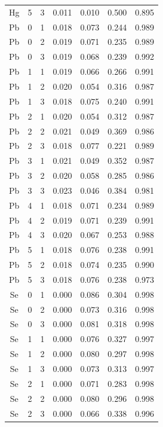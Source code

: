 \documentclass[ms, hidelinks]{uncgdissertationexp}
\theoremstyle{plain}
\theoremstyle{definition}
\theoremstyle{remark}
\begin{document}
\begin{longtable}{ccccccc}
Hg & 5 & 3 & 0.011 & 0.010 & 0.500 & 0.895\\
\rowcolor{gray!6}  Pb & 0 & 1 & 0.018 & 0.073 & 0.244 & 0.989\\
Pb & 0 & 2 & 0.019 & 0.071 & 0.235 & 0.989\\
\rowcolor{gray!6}  Pb & 0 & 3 & 0.019 & 0.068 & 0.239 & 0.992\\
Pb & 1 & 1 & 0.019 & 0.066 & 0.266 & 0.991\\
\rowcolor{gray!6}  Pb & 1 & 2 & 0.020 & 0.054 & 0.316 & 0.987\\
Pb & 1 & 3 & 0.018 & 0.075 & 0.240 & 0.991\\
\rowcolor{gray!6}  Pb & 2 & 1 & 0.020 & 0.054 & 0.312 & 0.987\\
Pb & 2 & 2 & 0.021 & 0.049 & 0.369 & 0.986\\
\rowcolor{gray!6}  Pb & 2 & 3 & 0.018 & 0.077 & 0.221 & 0.989\\
Pb & 3 & 1 & 0.021 & 0.049 & 0.352 & 0.987\\
\rowcolor{gray!6}  Pb & 3 & 2 & 0.020 & 0.058 & 0.285 & 0.986\\
Pb & 3 & 3 & 0.023 & 0.046 & 0.384 & 0.981\\
\rowcolor{gray!6}  Pb & 4 & 1 & 0.018 & 0.071 & 0.234 & 0.989\\
Pb & 4 & 2 & 0.019 & 0.071 & 0.239 & 0.991\\
\rowcolor{gray!6}  Pb & 4 & 3 & 0.020 & 0.067 & 0.253 & 0.988\\
Pb & 5 & 1 & 0.018 & 0.076 & 0.238 & 0.991\\
\rowcolor{gray!6}  Pb & 5 & 2 & 0.018 & 0.074 & 0.235 & 0.990\\
Pb & 5 & 3 & 0.018 & 0.076 & 0.238 & 0.973\\
\rowcolor{gray!6}  Se & 0 & 1 & 0.000 & 0.086 & 0.304 & 0.998\\
Se & 0 & 2 & 0.000 & 0.073 & 0.316 & 0.998\\
\rowcolor{gray!6}  Se & 0 & 3 & 0.000 & 0.081 & 0.318 & 0.998\\
Se & 1 & 1 & 0.000 & 0.076 & 0.327 & 0.997\\
\rowcolor{gray!6}  Se & 1 & 2 & 0.000 & 0.080 & 0.297 & 0.998\\
Se & 1 & 3 & 0.000 & 0.073 & 0.313 & 0.997\\
\rowcolor{gray!6}  Se & 2 & 1 & 0.000 & 0.071 & 0.283 & 0.998\\
Se & 2 & 2 & 0.000 & 0.080 & 0.296 & 0.998\\
\rowcolor{gray!6}  Se & 2 & 3 & 0.000 & 0.066 & 0.338 & 0.996\\

\end{longtable}
\end{document}
